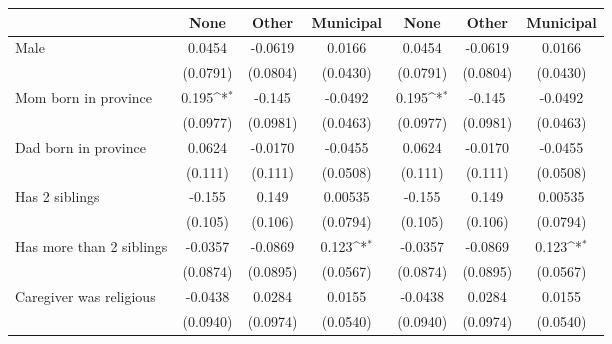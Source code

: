 {
\def\sym#1{\ifmmode^{#1}\else\(^{#1}\)\fi}
\begin{tabular}{l*{6}{c}}
\toprule
                    &\multicolumn{1}{c}{None}&\multicolumn{1}{c}{Other}&\multicolumn{1}{c}{Municipal}&\multicolumn{1}{c}{None}&\multicolumn{1}{c}{Other}&\multicolumn{1}{c}{Municipal}\\
\midrule
Male                &      0.0454         &     -0.0619         &      0.0166         &      0.0454         &     -0.0619         &      0.0166         \\
                    &    (0.0791)         &    (0.0804)         &    (0.0430)         &    (0.0791)         &    (0.0804)         &    (0.0430)         \\
\addlinespace
Mom born in province&       0.195\sym{*}  &      -0.145         &     -0.0492         &       0.195\sym{*}  &      -0.145         &     -0.0492         \\
                    &    (0.0977)         &    (0.0981)         &    (0.0463)         &    (0.0977)         &    (0.0981)         &    (0.0463)         \\
\addlinespace
Dad born in province&      0.0624         &     -0.0170         &     -0.0455         &      0.0624         &     -0.0170         &     -0.0455         \\
                    &     (0.111)         &     (0.111)         &    (0.0508)         &     (0.111)         &     (0.111)         &    (0.0508)         \\
\addlinespace
Has 2 siblings      &      -0.155         &       0.149         &     0.00535         &      -0.155         &       0.149         &     0.00535         \\
                    &     (0.105)         &     (0.106)         &    (0.0794)         &     (0.105)         &     (0.106)         &    (0.0794)         \\
\addlinespace
Has more than 2 siblings&     -0.0357         &     -0.0869         &       0.123\sym{*}  &     -0.0357         &     -0.0869         &       0.123\sym{*}  \\
                    &    (0.0874)         &    (0.0895)         &    (0.0567)         &    (0.0874)         &    (0.0895)         &    (0.0567)         \\
\addlinespace
Caregiver was religious&     -0.0438         &      0.0284         &      0.0155         &     -0.0438         &      0.0284         &      0.0155         \\
                    &    (0.0940)         &    (0.0974)         &    (0.0540)         &    (0.0940)         &    (0.0974)         &    (0.0540)         \\

\end{tabular}}
